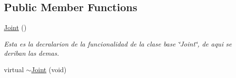 \subsection*{Public Member Functions}
\begin{DoxyCompactItemize}
\item 
\hypertarget{class_joint_a79a7a4715b2166714e039d7c7c5ea3b4}{\hyperlink{class_joint_a79a7a4715b2166714e039d7c7c5ea3b4}{Joint} ()}\label{class_joint_a79a7a4715b2166714e039d7c7c5ea3b4}

\begin{DoxyCompactList}\small\item\em Esta es la decralarion de la funcionalidad de la clase base \char`\"{}\-Joint\char`\"{}, de aqui se deriban las demas. \end{DoxyCompactList}\item 
\hypertarget{class_joint_ac9749eeeac49e9861554f2d580cc020d}{virtual \hyperlink{class_joint_ac9749eeeac49e9861554f2d580cc020d}{$\sim$\-Joint} (void)}\label{class_joint_ac9749eeeac49e9861554f2d580cc020d}


\end{DoxyCompactItemize}
